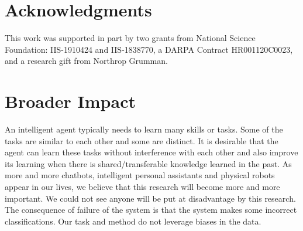 \documentclass{article}
\begin{document}
\section*{Acknowledgments}
This work was supported in part by two grants from National Science Foundation: IIS-1910424 and IIS-1838770, a DARPA Contract HR001120C0023, and a research gift from Northrop Grumman.

\section*{Broader Impact}
\label{sec:bi}

An intelligent agent typically needs to learn many skills or tasks. Some of the tasks are similar to each other and some are distinct. It is desirable that the agent can learn these tasks without interference with each other and also improve its learning when there is shared/transferable knowledge learned in the past. As more and more chatbots, intelligent personal assistants and physical robots appear in our lives, we believe that this research will become more and more important. We could not see anyone will be put at disadvantage by this research. The consequence of failure of the system is that the system makes some incorrect classifications. Our task and method do not  leverage biases in the data.










\end{document}
